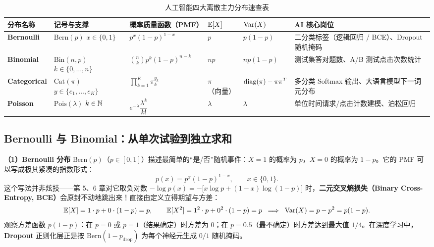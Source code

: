 \begin{table}[htbp]
  \centering
  \caption{人工智能四大离散主力分布速查表}
  \label{tab:ch2-discrete}
  \footnotesize
  \begin{tabularx}{\linewidth}{@{}p{23mm}p{20mm}p{33mm}p{15mm}p{17mm}X@{}}
    \toprule
    \textbf{分布名称} & \textbf{记号与支撑} & \textbf{概率质量函数（PMF）} & $\mathbb{E}[X]$ & $\operatorname{Var}(X)$ & \textbf{AI 核心岗位} \\
    \midrule
    \textbf{Bernoulli} & $\mathrm{Bern}(p)$ $x\in\{0,1\}$ & $p^x(1-p)^{1-x}$ & $p$ & $p(1-p)$ & 二分类标签（逻辑回归 / BCE）、Dropout 随机掩码 \\
    \textbf{Binomial} & $\mathrm{Bin}(n,p)$ $k\in\{0,\dots,n\}$ & $\binom{n}{k}p^k(1-p)^{n-k}$ & $np$ & $np(1-p)$ & 测试集答对题数、A/B 测试点击次数统计 \\
    \textbf{Categorical} & $\mathrm{Cat}(\pi)$ $y\in\{e_1,\dots,e_K\}$ & $\prod_{k=1}^K \pi_k^{y_k}$ & $\pi$（向量） & $\operatorname{diag}(\pi)-\pi\pi^T$ & 多分类 Softmax 输出、大语言模型下一词元分布 \\
    \textbf{Poisson} & $\mathrm{Pois}(\lambda)$ $k\in\mathbb{N}$ & $e^{-\lambda}\dfrac{\lambda^k}{k!}$ & $\lambda$ & $\lambda$ & 单位时间请求/点击计数建模、泊松回归 \\
    \bottomrule
  \end{tabularx}
\end{table}

\subsection{Bernoulli 与 Binomial：从单次试验到独立求和}

\textbf{（1）Bernoulli 分布} $\mathrm{Bern}(p)$（$p \in [0, 1]$）描述最简单的“是/否”随机事件：$X=1$ 的概率为 $p$，$X=0$ 的概率为 $1-p$。它的 PMF 可以写成极其紧凑的指数形式：
\begin{equation}
  p(x) = p^x (1 - p)^{1 - x}, \qquad x \in \{0, 1\}. \label{eq:ch2-bern}
\end{equation}
这个写法并非炫技——第 5、6 章对它取负对数 $-\log p(x) = -\bigl[x\log p + (1-x)\log(1-p)\bigr]$ 时，\textbf{二元交叉熵损失（Binary Cross-Entropy, BCE）}会原封不动地跳出来！直接由定义立得期望与方差：
\[
  \mathbb{E}[X] = 1\cdot p + 0\cdot(1-p) = p, \qquad
  \mathbb{E}[X^2] = 1^2\cdot p + 0^2\cdot(1-p) = p \;\implies\; \operatorname{Var}(X) = p - p^2 = p(1 - p).
\]
观察方差函数 $p(1-p)$：在 $p=0$ 或 $p=1$（结果确定）时方差为 $0$；在 $p=0.5$（最不确定）时方差达到最大值 $1/4$。在深度学习中，\textbf{Dropout} 正则化层正是按 $\mathrm{Bern}(1 - p_{\text{drop}})$ 为每个神经元生成 $0/1$ 随机掩码。

